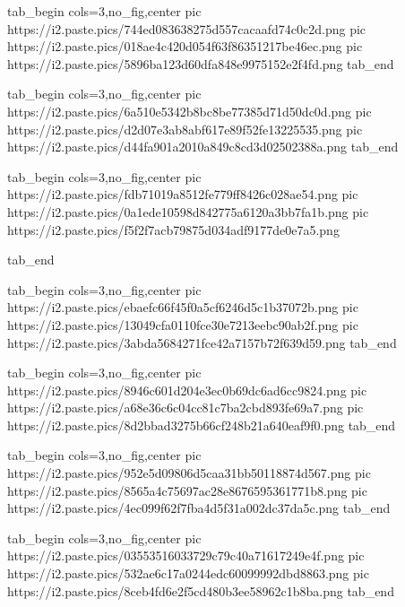  
 
 
 
 
\zzSecCmtScr


\ifcmt
  tab_begin cols=3,no_fig,center
     pic https://i2.paste.pics/744ed083638275d557cacaafd74c0c2d.png
		 pic https://i2.paste.pics/018ae4c420d054f63f86351217be46ec.png
		 pic https://i2.paste.pics/5896ba123d60dfa848e9975152e2f4fd.png
  tab_end
\fi

\ifcmt
  tab_begin cols=3,no_fig,center
	pic https://i2.paste.pics/6a510e5342b8bc8be77385d71d50dc0d.png
	pic https://i2.paste.pics/d2d07e3ab8abf617e89f52fe13225535.png
	pic https://i2.paste.pics/d44fa901a2010a849c8cd3d02502388a.png
  tab_end
\fi

\ifcmt
  tab_begin cols=3,no_fig,center
		pic https://i2.paste.pics/fdb71019a8512fe779ff8426c028ae54.png
		pic https://i2.paste.pics/0a1ede10598d842775a6120a3bb7fa1b.png
		pic https://i2.paste.pics/f5f2f7acb79875d034adf9177de0e7a5.png

  tab_end
\fi

\ifcmt
  tab_begin cols=3,no_fig,center
		pic https://i2.paste.pics/ebaefc66f45f0a5cf6246d5c1b37072b.png
		pic https://i2.paste.pics/13049cfa0110fce30e7213eebc90ab2f.png
		pic https://i2.paste.pics/3abda5684271fce42a7157b72f639d59.png
  tab_end
\fi

\ifcmt
  tab_begin cols=3,no_fig,center
		pic https://i2.paste.pics/8946c601d204e3ec0b69dc6ad6cc9824.png
		pic https://i2.paste.pics/a68e36c6c04cc81c7ba2cbd893fe69a7.png
		pic https://i2.paste.pics/8d2bbad3275b66cf248b21a640eaf9f0.png
  tab_end
\fi

\ifcmt
  tab_begin cols=3,no_fig,center
		pic https://i2.paste.pics/952e5d09806d5caa31bb50118874d567.png
		pic https://i2.paste.pics/8565a4c75697ac28e8676595361771b8.png
		pic https://i2.paste.pics/4ec099f62f7fba4d5f31a002dc37da5c.png
  tab_end
\fi

\ifcmt
  tab_begin cols=3,no_fig,center
		pic https://i2.paste.pics/03553516033729c79c40a71617249e4f.png
		pic https://i2.paste.pics/532ae6c17a0244edc60099992dbd8863.png
		pic https://i2.paste.pics/8ceb4fd6e2f5cd480b3ee58962c1b8ba.png
  tab_end
\fi

